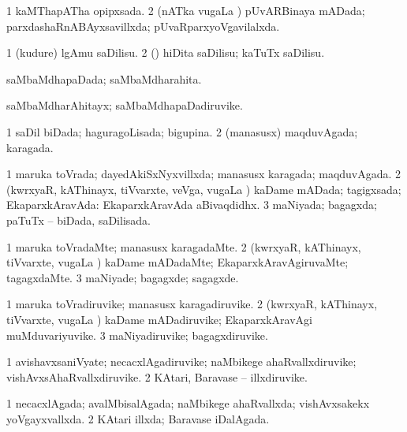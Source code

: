 {{\bentry
{} 
\gl{\gu}
\expl{}
\bmng
\bnum
\num{1} kaMThapATha opipxsada. 
\num{2} (nATka \mo vugaLa \vi) pUvARBinaya mADada; parxdashaRnABAyxsavillxda; pUvaRparxyoVgavilalxda. 
\enum
\emng
\eentry

\bentry
{} 
\gl{\sakirx}
\expl{}
\bmng
\bnum
\num{1} (kudure) lgAmu saDilisu. 
\num{2} (\rUpa) hiDita saDilisu; kaTuTx saDilisu. 
\enum
\emng
\eentry

\bentry
{} 
\gl{\gu}
\expl{}
\bmng
saMbaMdhapaDada; saMbaMdharahita. 
\emng
\eentry

\bentry
{} 
\gl{\nA}
\expl{}
\bmng
saMbaMdharAhitayx; saMbaMdhapaDadiruvike. 
\emng
\eentry

\bentry
{} 
\gl{\gu}
\expl{}
\bmng
\bnum
\num{1} saDil biDada; haguragoLisada; bigupina. 
\num{2} (manasusx) maqduvAgada; karagada. 
\enum
\emng
\eentry

\bentry
{} 
\gl{\gu}
\expl{}
\bmng
\bnum
\num{1} maruka toVrada; dayedAkiSxNyxvillxda; manasusx karagada; maqduvAgada. 
\num{2} (kwrxyaR, kAThinayx, tiVvarxte, veVga, \mo vugaLa \vi) kaDame mADada; tagigxsada; EkaparxkAravAda:  EkaparxkAravAda aBivaqdidhx. 
\num{3} maNiyada; bagagxda; paTuTx -- biDada, saDilisada. 
\enum
\emng
\eentry

\bentry
{} 
\gl{\kirxvi}
\expl{}
\bmng
\bnum
\num{1} maruka toVradaMte; manasusx karagadaMte. 
\num{2} (kwrxyaR, kAThinayx, tiVvarxte, \mo vugaLa \vi) kaDame mADadaMte; EkaparxkAravAgiruvaMte; tagagxdaMte. 
\num{3} maNiyade; bagagxde; sagagxde. 
\enum
\emng
\eentry

\bentry
{} 
\gl{\nA}
\expl{}
\bmng
\bnum
\num{1} maruka toVradiruvike; manasusx karagadiruvike. 
\num{2} (kwrxyaR, kAThinayx, tiVvarxte, \mo vugaLa \vi) kaDame mADadiruvike; EkaparxkAravAgi muMduvariyuvike. 
\num{3} maNiyadiruvike; bagagxdiruvike. 
\enum
\emng
\eentry

\bentry
{} 
\gl{\nA}
\expl{}
\bmng
\bnum
\num{1} avishavxsaniVyate; necacxlAgadiruvike; naMbikege ahaRvallxdiruvike; vishAvxsAhaRvallxdiruvike. 
\num{2} KAtari, Baravase -- illxdiruvike. 
\enum
\emng
\eentry

\bentry
{} 
\gl{\gu}
\expl{}
\bmng
\bnum
\num{1} necacxlAgada; avalMbisalAgada; naMbikege ahaRvallxda; vishAvxsakekx yoVgayxvallxda. 
\num{2} KAtari illxda; Baravase iDalAgada. 
\enum
\emng
\eentry

}}
